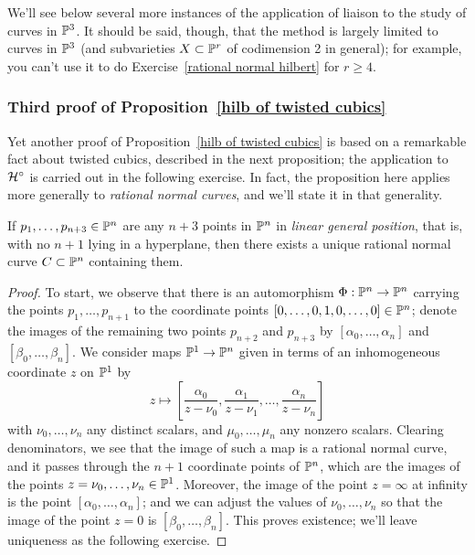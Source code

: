 We'll see below several more instances of the application of liaison to the study of curves in ${\mathbb P}^3$. It should be said, though, that the method is largely limited to curves in ${\mathbb P}^3$ (and subvarieties $X \subset {\mathbb P}^r$ of codimension 2 in general); for example, you can't use it to do Exercise~\ref{rational normal hilbert} for $r \geq 4$.

\subsubsection{Third proof of Proposition~\ref{hilb of twisted cubics}}

Yet another proof of Proposition~\ref{hilb of twisted cubics} is based on a remarkable fact about twisted cubics, described in the next proposition; the application to ${\cal H}^\circ$ is carried out in the following exercise. In fact, the proposition here applies more generally to \emph{rational normal curves}, and we'll state it in that generality.

\begin{proposition}\label{points on rnc}
If $p_1,\dots, p_{n+3} \in {\mathbb P}^n$ are any $n+3$ points in ${\mathbb P}^n$ in \emph{linear general position}, that is, with no $n+1$ lying in a hyperplane, then there exists a unique rational normal curve $C \subset {\mathbb P}^n$ containing them.
 \end{proposition}

\begin{proof}
To start, we observe that there is an automorphism $\Phi : {\mathbb P}^n \to {\mathbb P}^n$ carrying the points $p_1,\dots,p_{n+1}$ to the coordinate points $[0,\dots,0,1,0,\dots,0] \in {\mathbb P}^n$; denote the images of the remaining two points $p_{n+2}$ and $p_{n+3}$ by $[\alpha_0,\dots,\alpha_n]$ and $[\beta_0,\dots,\beta_n]$. We consider maps ${\mathbb P}^1 \to {\mathbb P}^n$ given in terms of an inhomogeneous coordinate $z$ on ${\mathbb P}^1$ by
$$
z \mapsto \left[ \frac{\alpha_0}{z - \nu_0}, \frac{\alpha_1}{z - \nu_1} , \dots, \frac{\alpha_n}{z - \nu_n}  \right]
$$
with $\nu_0,\dots,\nu_n$ any distinct scalars, and $\mu_0,\dots,\mu_n$ any nonzero  scalars. Clearing denominators, we see that the image of such a map is a rational normal curve, and it passes through the $n+1$ coordinate points of ${\mathbb P}^n$, which are the images of the points $z = \nu_0, \dots, \nu_n \in {\mathbb P}^1$. Moreover, the image of the point $z = \infty$ at infinity is the point $[\alpha_0,\dots,\alpha_n]$; and we can adjust the values of $\nu_0,\dots,\nu_n$ so that the image of the point $z = 0$ is $[\beta_0,\dots,\beta_n]$. This proves existence; we'll leave uniqueness as the following exercise. 
\end{proof}

